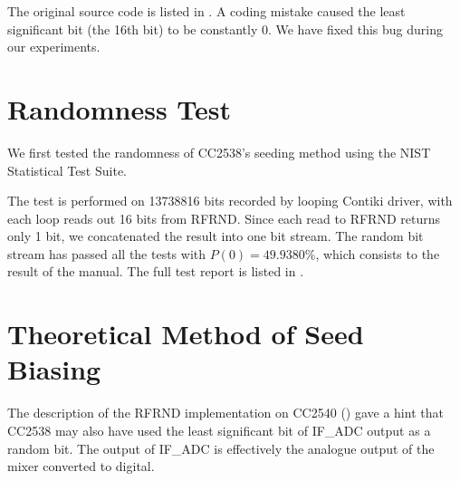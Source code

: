The original source code is listed in . A coding mistake caused the least significant bit (the 16th bit) to be constantly 0. We have fixed this bug during our experiments.

\section{Randomness Test}
We first tested the randomness of CC2538's seeding method using the NIST Statistical Test Suite\cite{NistTestSuite}. 

The test is performed on 13738816 bits recorded by looping Contiki driver, with each loop reads out 16 bits from RFRND. Since each read to RFRND returns only 1 bit, we concatenated the result into one bit stream. The random bit stream has passed all the tests with $P(0) = 49.9380\%$, which consists to the result of the manual. The full test report is listed in .
%
%
%
%

\section{Theoretical Method of Seed Biasing}

The description of the RFRND implementation on CC2540 () gave a hint that CC2538 may also have used the least significant bit of IF\_ADC output as  a random bit. The output of IF\_ADC is effectively the analogue output of the mixer converted to digital.

